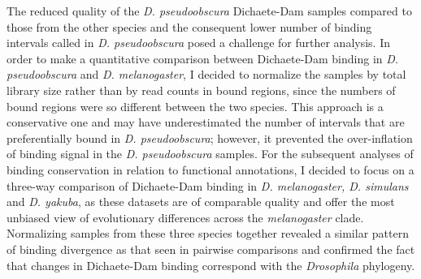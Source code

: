 The reduced quality of the \emph{D. pseudoobscura} Dichaete-Dam samples compared to those from the other species and the consequent lower number of binding intervals called in \emph{D. pseudoobscura} posed a challenge for further analysis. In order to make a quantitative comparison between Dichaete-Dam binding in \emph{D. pseudoobscura} and \emph{D. melanogaster}, I decided to normalize the samples by total library size rather than by read counts in bound regions, since the numbers of bound regions were so different between the two species. This approach is a conservative one and may have underestimated the number of intervals that are preferentially bound in \emph{D. pseudoobscura}; however, it prevented the over-inflation of binding signal in the \emph{D. pseudoobscura} samples. For the subsequent analyses of binding conservation in relation to functional annotations, I decided to focus on a three-way comparison of Dichaete-Dam binding in \emph{D. melanogaster, D. simulans} and \emph{D. yakuba}, as these datasets are of comparable quality and offer the most unbiased view of evolutionary differences across the \emph{melanogaster} clade. Normalizing samples from these three species together revealed a similar pattern of binding divergence as that seen in pairwise comparisons and confirmed the fact that changes in Dichaete-Dam binding correspond with the \emph{Drosophila} phylogeny.

